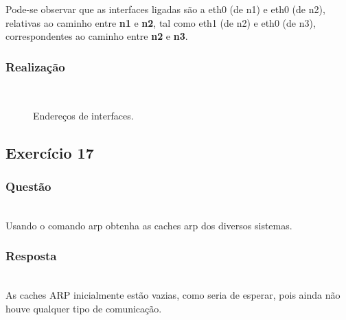 \documentclass{llncs}
\begin{document}
Pode-se observar que as interfaces ligadas são a eth0 (de n1) e eth0 (de n2), relativas ao caminho entre \textbf{n1} e \textbf{n2}, tal como eth1 (de n2) e eth0 (de n3), correspondentes ao caminho entre \textbf{n2} e \textbf{n3}.

\subsubsection{Realização}\rule[-10pt]{0pt}{10pt}\\

\begin{figure}
	\caption{Endereços de interfaces.}
	\label{fig:ifconfig}
\end{figure} 

\clearpage
\subsection{Exercício 17}
\subsubsection{Questão}\rule[-10pt]{0pt}{10pt}\\

Usando o comando arp obtenha as caches arp dos diversos sistemas.

\subsubsection{Resposta}\rule[-10pt]{0pt}{10pt}\\

As caches ARP inicialmente estão vazias, como seria de esperar, pois ainda não houve qualquer tipo de comunicação.
\end{document}
